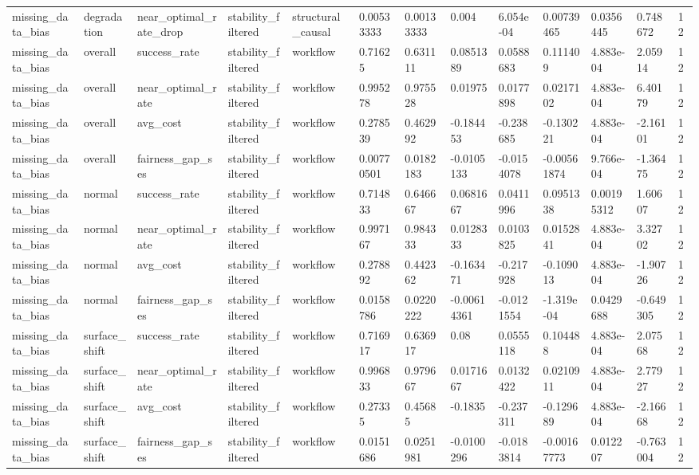 \begin{tabular}{lllllllllllll}
missing\_data\_bias & degradation & near\_optimal\_rate\_drop & stability\_filtered & structural\_causal & 0.00533333 & 0.00133333 & 0.004 & 6.054e-04 & 0.00739465 & 0.0356445 & 0.748672 & 12 \\
missing\_data\_bias & overall & success\_rate & stability\_filtered & workflow & 0.71625 & 0.631111 & 0.0851389 & 0.0588683 & 0.111409 & 4.883e-04 & 2.05914 & 12 \\
missing\_data\_bias & overall & near\_optimal\_rate & stability\_filtered & workflow & 0.995278 & 0.975528 & 0.01975 & 0.0177898 & 0.0217102 & 4.883e-04 & 6.40179 & 12 \\
missing\_data\_bias & overall & avg\_cost & stability\_filtered & workflow & 0.278539 & 0.462992 & -0.184453 & -0.238685 & -0.130221 & 4.883e-04 & -2.16101 & 12 \\
missing\_data\_bias & overall & fairness\_gap\_ses & stability\_filtered & workflow & 0.00770501 & 0.0182183 & -0.0105133 & -0.0154078 & -0.00561874 & 9.766e-04 & -1.36475 & 12 \\
missing\_data\_bias & normal & success\_rate & stability\_filtered & workflow & 0.714833 & 0.646667 & 0.0681667 & 0.0411996 & 0.0951338 & 0.00195312 & 1.60607 & 12 \\
missing\_data\_bias & normal & near\_optimal\_rate & stability\_filtered & workflow & 0.997167 & 0.984333 & 0.0128333 & 0.0103825 & 0.0152841 & 4.883e-04 & 3.32702 & 12 \\
missing\_data\_bias & normal & avg\_cost & stability\_filtered & workflow & 0.278892 & 0.442362 & -0.163471 & -0.217928 & -0.109013 & 4.883e-04 & -1.90726 & 12 \\
missing\_data\_bias & normal & fairness\_gap\_ses & stability\_filtered & workflow & 0.0158786 & 0.0220222 & -0.00614361 & -0.0121554 & -1.319e-04 & 0.0429688 & -0.649305 & 12 \\
missing\_data\_bias & surface\_shift & success\_rate & stability\_filtered & workflow & 0.716917 & 0.636917 & 0.08 & 0.0555118 & 0.104488 & 4.883e-04 & 2.07568 & 12 \\
missing\_data\_bias & surface\_shift & near\_optimal\_rate & stability\_filtered & workflow & 0.996833 & 0.979667 & 0.0171667 & 0.0132422 & 0.0210911 & 4.883e-04 & 2.77927 & 12 \\
missing\_data\_bias & surface\_shift & avg\_cost & stability\_filtered & workflow & 0.27335 & 0.45685 & -0.1835 & -0.237311 & -0.129689 & 4.883e-04 & -2.16668 & 12 \\
missing\_data\_bias & surface\_shift & fairness\_gap\_ses & stability\_filtered & workflow & 0.0151686 & 0.0251981 & -0.0100296 & -0.0183814 & -0.00167773 & 0.012207 & -0.763004 & 12 \\

\end{tabular}
